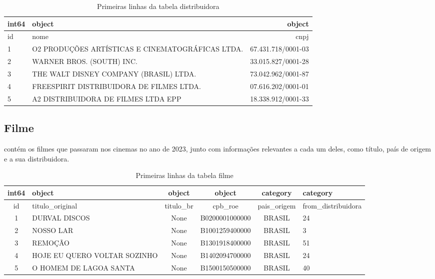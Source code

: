 \documentclass[12pt, a4paper]{article}
\begin{document}
\begin{table}[h]
    \centering
    \begin{tabular}{l|l|r}
    int64 & object & object\\
    \hline
    id    & nome   & cnpj\\
    \hline
    1& O2 PRODUÇÕES ARTÍSTICAS E CINEMATOGRÁFICAS LTDA. & 67.431.718/0001-03\\
    2& WARNER BROS. (SOUTH) INC. & 33.015.827/0001-28\\
    3& THE WALT DISNEY COMPANY (BRASIL) LTDA. & 73.042.962/0001-87\\
    \hline
    4& FREESPIRIT DISTRIBUIDORA DE FILMES LTDA. & 07.616.202/0001-01\\
    5& A2 DISTRIBUIDORA DE FILMES LTDA EPP & 18.338.912/0001-33\\
    \end{tabular}
    \caption{Primeiras linhas da tabela distribuidora}
    \label{tab:Distribuidora}
\end{table}

\newpage


\subsection{Filme}

contém os filmes que passaram nos cinemas no ano de 2023, junto com informações relevantes a cada um deles, como título, país de origem e a sua distribuidora.
\begin{table}[h]
    \centering
    \renewcommand{\arraystretch}{1.5}
    \begin{tabular}{c| m{3cm} |c|c|c|l}
    int64 & object & object & object & category & category\\
    \hline
    id & titulo\_original & titulo\_br & cpb\_roe & pais\_origem & from\_distribuidora \\
    \hline
    1&                 DURVAL DISCOS&      None&  B0200001000000&      BRASIL& 24   \\
    2&                     NOSSO LAR&      None&  B1001259400000&      BRASIL& 3   \\
    3&                       REMOÇÃO&      None&  B1301918400000&      BRASIL& 51   \\
    \hline
    4&  HOJE EU QUERO VOLTAR SOZINHO&      None&  B1402094700000&      BRASIL& 24   \\
    5&        O HOMEM DE LAGOA SANTA&      None&  B1500150500000&      BRASIL& 40  \\
    \end{tabular}
    \caption{Primeiras linhas da tabela filme}
    \label{tab:filme}
\end{table}
\end{document}
